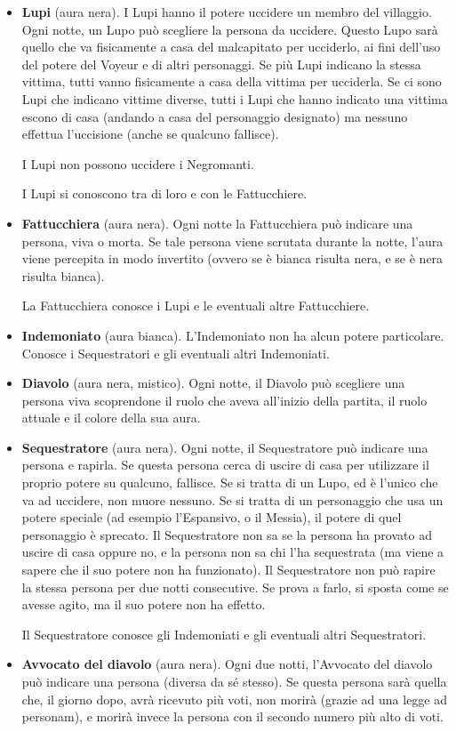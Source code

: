 \documentclass[a4paper,10pt]{article}
\begin{document}
\begin{itemize}
 \item {\bf Lupi} (aura nera). I Lupi hanno il potere uccidere un membro del villaggio.
 Ogni notte, un Lupo può scegliere la persona da uccidere. Questo Lupo sarà quello che va fisicamente a casa del malcapitato per ucciderlo, ai fini dell'uso del potere del Voyeur e di altri personaggi. Se più Lupi indicano la stessa vittima, tutti vanno fisicamente a casa della vittima per ucciderla.
 Se ci sono Lupi che indicano vittime diverse, tutti i Lupi che hanno indicato una vittima escono di casa (andando a casa del personaggio designato) ma nessuno effettua l'uccisione (anche se qualcuno fallisce).
 
 I Lupi non possono uccidere i Negromanti.
 
 I Lupi si conoscono tra di loro e con le Fattucchiere.

 \item {\bf Fattucchiera} (aura nera). Ogni notte la Fattucchiera può indicare una persona, viva o morta. Se tale persona viene scrutata durante la notte, l'aura viene percepita in modo invertito (ovvero se è bianca risulta nera, e se è nera risulta bianca).
 
 La Fattucchiera conosce i Lupi e le eventuali altre Fattucchiere.
 
 \item {\bf Indemoniato} (aura bianca). L'Indemoniato non ha alcun potere particolare. Conosce i Sequestratori e gli eventuali altri Indemoniati.

 \item {\bf Diavolo} (aura nera, mistico). Ogni notte, il Diavolo può scegliere una persona viva scoprendone il ruolo che aveva all'inizio della partita, il ruolo attuale e il colore della sua aura.
 
 \item {\bf Sequestratore} (aura nera). Ogni notte, il Sequestratore può indicare una persona e rapirla. Se questa persona cerca di uscire di casa per utilizzare il proprio potere su qualcuno, fallisce. Se si tratta di un Lupo, ed è l'unico che va ad uccidere, non muore nessuno. Se si tratta di un personaggio che usa un potere speciale (ad esempio l'Espansivo, o il Messia), il potere di quel personaggio è sprecato.
 Il Sequestratore non sa se la persona ha provato ad uscire di casa oppure no, e la persona non sa chi l'ha sequestrata (ma viene a sapere che il suo potere non ha funzionato).
 Il Sequestratore non può rapire la stessa persona per due notti consecutive. Se prova a farlo, si sposta come se avesse agito, ma il suo potere non ha effetto.
 
 Il Sequestratore conosce gli Indemoniati e gli eventuali altri Sequestratori.

 \item {\bf Avvocato del diavolo} (aura nera). Ogni due notti, l'Avvocato del diavolo può indicare una persona (diversa da sé stesso). Se questa persona sarà quella che, il giorno dopo, avrà ricevuto più voti, non morirà (grazie ad una legge ad personam), e morirà invece la persona con il secondo numero più alto di voti.


\end{itemize}
\end{document}

